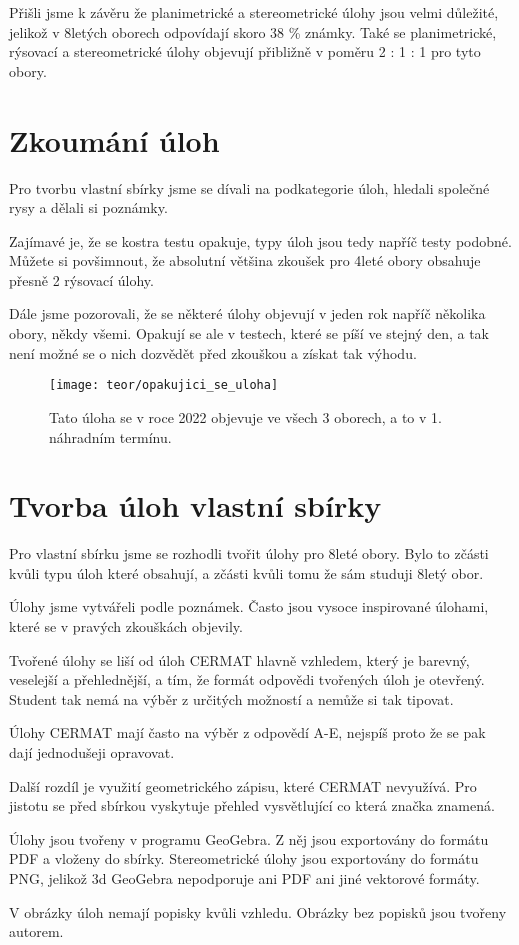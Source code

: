 Přišli jsme k závěru že planimetrické a stereometrické úlohy jsou velmi důležité, jelikož v 8letých oborech odpovídají skoro 38 \% známky. Také se planimetrické, rýsovací a stereometrické úlohy objevují přibližně v poměru 2 : 1 : 1 pro tyto obory.




\section{Zkoumání úloh}

Pro tvorbu vlastní sbírky jsme se dívali na podkategorie úloh, hledali společné rysy a dělali si poznámky.

Zajímavé je, že se kostra testu opakuje, typy úloh jsou tedy napříč testy podobné. Můžete si povšimnout, že absolutní většina zkoušek pro 4leté obory obsahuje přesně 2 rýsovací úlohy.

Dále jsme pozorovali, že se některé úlohy objevují v jeden rok napříč několika obory, někdy všemi. Opakují se ale v testech, které se píší ve stejný den, a tak není možné se o nich dozvědět před zkouškou a získat tak výhodu.


\begin{figure}[h]
    \caption{Tato úloha se v roce 2022 objevuje ve všech 3 oborech, a to v 1. náhradním termínu.~\cite{CERMAT_pdfka}}
    \centering
    \texttt{[image: teor/opakujici\_se\_uloha]}
\end{figure}


\section{Tvorba úloh vlastní sbírky}

Pro vlastní sbírku jsme se rozhodli tvořit úlohy pro 8leté obory. Bylo to zčásti kvůli typu úloh které obsahují, a zčásti kvůli tomu že sám studuji 8letý obor.

Úlohy jsme vytvářeli podle poznámek. Často jsou vysoce inspirované úlohami, které se v pravých zkouškách objevily.

Tvořené úlohy se liší od úloh CERMAT hlavně vzhledem, který je barevný, veselejší a přehlednější, a tím, že formát odpovědi tvořených úloh je otevřený. Student tak nemá na výběr z určitých možností a nemůže si tak tipovat.

Úlohy CERMAT mají často na výběr z odpovědí A-E, nejspíš proto že se pak dají jednodušeji opravovat.

Další rozdíl je využití geometrického zápisu, které CERMAT nevyužívá. Pro jistotu se před sbírkou vyskytuje přehled vysvětlující co která značka znamená.

Úlohy jsou tvořeny v programu GeoGebra. Z něj jsou exportovány do formátu PDF a vloženy do sbírky. Stereometrické úlohy jsou exportovány do formátu PNG, jelikož 3d GeoGebra nepodporuje ani PDF ani jiné vektorové formáty.

V obrázky úloh nemají popisky kvůli vzhledu. Obrázky bez popisků jsou tvořeny autorem.
